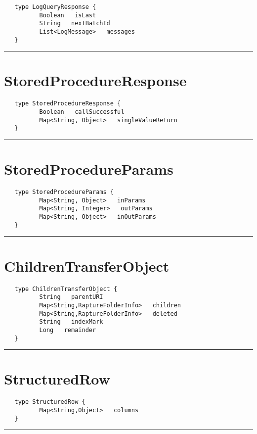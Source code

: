 \begin{verbatim}
   type LogQueryResponse {
          Boolean   isLast
          String   nextBatchId
          List<LogMessage>   messages
   }
\end{verbatim}

\rule{15cm}{2pt}
\section{StoredProcedureResponse}
\label{type:StoredProcedureResponse}

\begin{verbatim}
   type StoredProcedureResponse {
          Boolean   callSuccessful
          Map<String, Object>   singleValueReturn
   }
\end{verbatim}

\rule{15cm}{2pt}
\section{StoredProcedureParams}
\label{type:StoredProcedureParams}

\begin{verbatim}
   type StoredProcedureParams {
          Map<String, Object>   inParams
          Map<String, Integer>   outParams
          Map<String, Object>   inOutParams
   }
\end{verbatim}

\rule{15cm}{2pt}
\section{ChildrenTransferObject}
\label{type:ChildrenTransferObject}

\begin{verbatim}
   type ChildrenTransferObject {
          String   parentURI
          Map<String,RaptureFolderInfo>   children
          Map<String,RaptureFolderInfo>   deleted
          String   indexMark
          Long   remainder
   }
\end{verbatim}

\rule{15cm}{2pt}
\section{StructuredRow}
\label{type:StructuredRow}

\begin{verbatim}
   type StructuredRow {
          Map<String,Object>   columns
   }
\end{verbatim}

\rule{15cm}{2pt}
